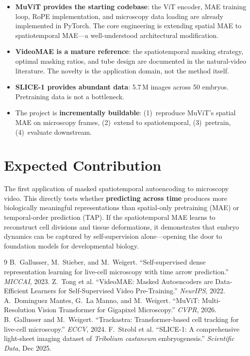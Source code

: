 \documentclass{article}
\begin{document}
\begin{itemize}
	\item \textbf{MuViT provides the starting codebase}: the ViT encoder, MAE training loop, RoPE implementation, and microscopy data loading are already implemented in PyTorch. The core engineering is extending spatial MAE to spatiotemporal MAE---a well-understood architectural modification.
	\item \textbf{VideoMAE is a mature reference}: the spatiotemporal masking strategy, optimal masking ratios, and tube design are documented in the natural-video literature. The novelty is the application domain, not the method itself.
	\item \textbf{SLICE-1 provides abundant data}: 5.7\,M images across 50 embryos. Pretraining data is not a bottleneck.
	\item The project is \textbf{incrementally buildable}: (1)~reproduce MuViT's spatial MAE on microscopy frames, (2)~extend to spatiotemporal, (3)~pretrain, (4)~evaluate downstream.
\end{itemize}

\section*{Expected Contribution}

The first application of masked spatiotemporal autoencoding to microscopy video. This directly tests whether \textbf{predicting across time} produces more biologically meaningful representations than spatial-only pretraining (MAE) or temporal-order prediction (TAP). If the spatiotemporal MAE learns to reconstruct cell divisions and tissue deformations, it demonstrates that embryo dynamics can be captured by self-supervision alone---opening the door to foundation models for developmental biology.

\begin{thebibliography}{9}
	 B.~Gallusser, M.~Stieber, and M.~Weigert. ``Self-supervised dense representation learning for live-cell microscopy with time arrow prediction.'' \textit{MICCAI}, 2023.
	 Z.~Tong et al. ``VideoMAE: Masked Autoencoders are Data-Efficient Learners for Self-Supervised Video Pre-Training.'' \textit{NeurIPS}, 2022.
	 A.~Dominguez Mantes, G.~La Manno, and M.~Weigert. ``MuViT: Multi-Resolution Vision Transformer for Gigapixel Microscopy.'' \textit{CVPR}, 2026.
	 B.~Gallusser and M.~Weigert. ``Trackastra: Transformer-based cell tracking for live-cell microscopy.'' \textit{ECCV}, 2024.
	 F.~Strobl et al. ``SLICE-1: A comprehensive light-sheet imaging dataset of \textit{Tribolium castaneum} embryogenesis.'' \textit{Scientific Data}, Dec 2025.
\end{thebibliography}
\end{document}
